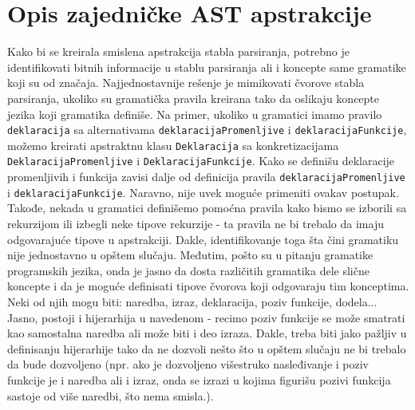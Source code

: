 \chapter{Opis zajedničke AST apstrakcije}
\label{chp:MyAST}

Kako bi se kreirala smislena apstrakcija stabla parsiranja, potrebno je identifikovati bitnih informacije u stablu parsiranja ali i koncepte same gramatike koji su od značaja. Najjednostavnije rešenje je mimikovati čvorove stabla parsiranja, ukoliko su gramatička pravila kreirana tako da oslikaju koncepte jezika koji gramatika definiše. Na primer, ukoliko u gramatici imamo pravilo \texttt{deklaracija} sa alternativama \texttt{deklaracijaPromenljive} i \texttt{deklaracijaFunkcije}, možemo kreirati apstraktnu klasu \texttt{Deklaracija} sa konkretizacijama \texttt{DeklaracijaPromenljive} i \texttt{DeklaracijaFunkcije}. Kako se definišu deklaracije promenljivih i funkcija zavisi dalje od definicija pravila \texttt{deklaracijaPromenljive} i \texttt{deklaracijaFunkcije}. Naravno, nije uvek moguće primeniti ovakav postupak. Takođe, nekada u gramatici definišemo pomoćna pravila kako bismo se izborili sa rekurzijom ili izbegli neke tipove rekurzije - ta pravila ne bi trebalo da imaju odgovarajuće tipove u apstrakciji. Dakle, identifikovanje toga šta čini gramatiku nije jednostavno u opštem slučaju. Međutim, pošto su u pitanju gramatike programskih jezika, onda je jasno da dosta različitih gramatika dele slične koncepte i da je moguće definisati tipove čvorova koji odgovaraju tim konceptima. Neki od njih mogu biti: naredba, izraz, deklaracija, poziv funkcije, dodela... Jasno, postoji i hijerarhija u navedenom - recimo poziv funkcije se može smatrati kao samostalna naredba ali može biti i deo izraza. Dakle, treba biti jako pažljiv u definisanju hijerarhije tako da ne dozvoli nešto što u opštem slučaju ne bi trebalo da bude dozvoljeno (npr. ako je dozvoljeno višestruko nasleđivanje i poziv funkcije je i naredba ali i izraz, onda se izrazi u kojima figurišu pozivi funkcija sastoje od više naredbi, što nema smisla.).

